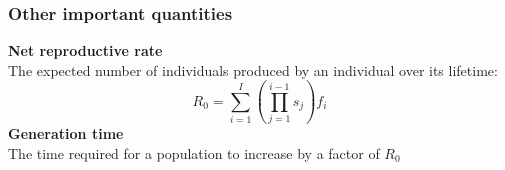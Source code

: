 \documentclass[color=usenames,dvipsnames]{beamer}\usepackage[]{graphicx}\usepackage[]{color}
\begin{document}



\begin{frame}
  \frametitle{Other important quantities}
  {\bf Net reproductive rate \\}
  The expected number of individuals produced by an individual over
  its lifetime: \\
  \[
    R_0 = \sum_{i=1}^I \left(\prod_{j=1}^{i-1} s_j\right)f_i
  \]
  \pause
  \vfill
  {\bf Generation time \\}
  The time required for a population to increase by a factor of $R_0$
\end{frame}


















\end{document}
